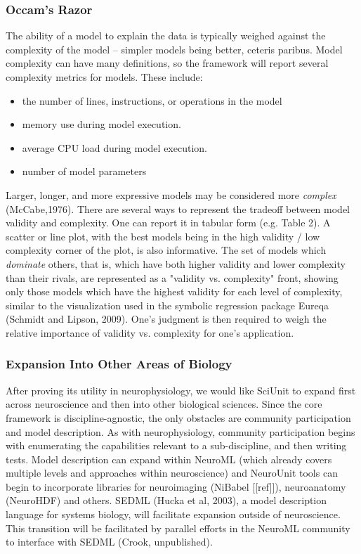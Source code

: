 \documentclass[11pt,letterpaper]{article}
\begin{document}
\subsubsection{Occam's Razor}
The ability of a model to explain the data is typically weighed against the complexity of the model -- simpler models being better, ceteris paribus.  Model complexity can have many definitions, so the framework will report several complexity metrics for models.  These include:
\begin{itemize}
\item the number of lines, instructions, or operations in the model
\item memory use during model execution.  
\item average CPU load during model execution.  
\item number of model parameters
\end{itemize}
Larger, longer, and more expressive models may be considered more \textit{complex} (McCabe,1976).  There are several ways to represent the tradeoff between model validity and complexity.  One can report it in tabular form (e.g. Table 2).  A scatter or line plot, with the best models being in the high validity / low complexity corner of the plot, is also informative.  The set of models which \textit{dominate} others, that is, which have both higher validity and lower complexity than their rivals, are represented as a "validity vs. complexity" front, showing only those models which have the highest validity for each level of complexity, similar to the visualization used in the symbolic regression package Eureqa (Schmidt and Lipson, 2009).  One's judgment is then required to weigh the relative importance of validity vs. complexity for one's application.  

\subsubsection{Expansion Into Other Areas of Biology}
After proving its utility in neurophysiology, we would like SciUnit to expand first across neuroscience and then into other biological sciences.  Since the core framework is discipline-agnostic, the only obstacles are community participation and model description.  As with neurophysiology, community participation begins with enumerating the capabilities relevant to a sub-discipline, and then writing tests.  Model description can expand within NeuroML (which already covers multiple levels and approaches within neuroscience) and NeuroUnit tools can begin to incorporate libraries for neuroimaging (NiBabel [[ref]]), neuroanatomy (NeuroHDF) and others.  SEDML (Hucka et al, 2003), a model description language for systems biology, will facilitate expansion outside of neuroscience.  This transition will be facilitated by parallel efforts in the NeuroML community to interface with SEDML (Crook, unpublished).  
\end{document}
